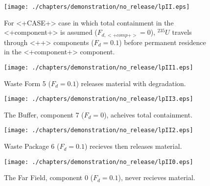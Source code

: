 \begin{figure}[ht]
\centering
\texttt{[image: ./chapters/demonstration/no\_release/lpII.eps]}
\caption[$^{235}U$ residence. Lumped Parameter  <+Component+> No Release.]{
For <+CASE+> case in which total containment in the <+component+> is assumed 
($F_{d,<+comp+>}=0$), $^{235}U$ travels through <++> components ($F_d = 0.1$) before 
permanent residence in the <+component+> component.
}
\label{fig:lpIIall}
\begin{minipage}[b]{0.45\linewidth}

  \texttt{[image: ./chapters/demonstration/no\_release/lpII1.eps]}
  \caption[1DII Waste Form Contaminants.]{
    Waste Form 5 ($F_d = 0.1$) releases material with degradation. 
    }
  \label{fig:lpIIwf5}
  
  \texttt{[image: ./chapters/demonstration/no\_release/lpII3.eps]}
  \caption[Case 1DII Buffer Contaminants]{
    The Buffer, component 7 ($F_d=0$), acheives total containment.
    }
  \label{fig:lpIIbuff}

\end{minipage}
\hspace{0.05\linewidth}
\begin{minipage}[b]{0.45\linewidth}
  \texttt{[image: ./chapters/demonstration/no\_release/lpII2.eps]}
  \caption[Case 1DII Waste Package Contaminants.]{ 
    Waste Package 6 ($F_d = 0.1$) recieves then releases material. 
    }
  \label{fig:lpIIwp6}

  \texttt{[image: ./chapters/demonstration/no\_release/lpII0.eps]}
  \caption[Case 1DII Waste Package Contaminants.]{ 
    The Far Field, component 0 ($F_d = 0.1$), never recieves material.
    }
  \label{fig:lpIIff0}


  \end{minipage}
\end{figure}
